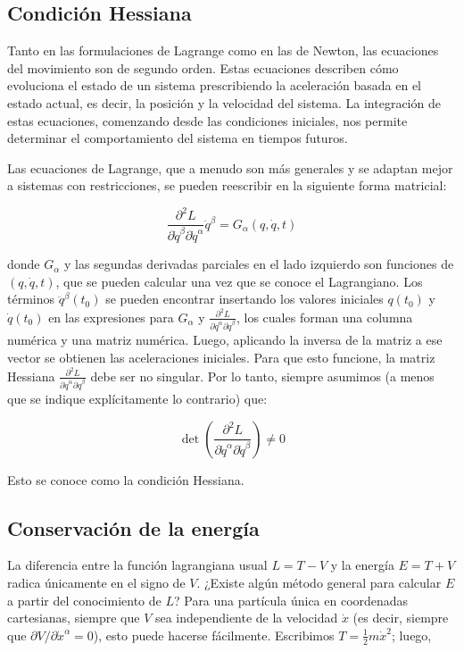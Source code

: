 \subsection{Condición Hessiana}

Tanto en las formulaciones de Lagrange como en las de Newton, las ecuaciones del movimiento son de segundo orden. Estas ecuaciones describen cómo evoluciona el estado de un sistema prescribiendo la aceleración basada en el estado actual, es decir, la posición y la velocidad del sistema. La integración de estas ecuaciones, comenzando desde las condiciones iniciales, nos permite determinar el comportamiento del sistema en tiempos futuros.

Las ecuaciones de Lagrange, que a menudo son más generales y se adaptan mejor a sistemas con restricciones, se pueden reescribir en la siguiente forma matricial:

\[
\frac{\partial^2 L}{\partial \dot{q}^\beta \partial \dot{q}^\alpha} \ddot{q}^\beta = G_\alpha (q, \dot{q}, t)
\]

donde $ G_\alpha $ y las segundas derivadas parciales en el lado izquierdo son funciones de $ (q, \dot{q}, t) $, que se pueden calcular una vez que se conoce el Lagrangiano. Los términos $ \ddot{q}^\beta \left(t_0\right) $ se pueden encontrar insertando los valores iniciales $ q \left(t_0\right) $ y $ \dot{q} \left(t_0\right) $ en las expresiones para $ G_\alpha $ y $ \frac{\partial^2 L}{\partial \dot{q}^\alpha \partial \dot{q}^\beta} $, los cuales forman una columna numérica y una matriz numérica. Luego, aplicando la inversa de la matriz a ese vector se obtienen las aceleraciones iniciales. Para que esto funcione, la matriz Hessiana $ \frac{\partial^2 L}{\partial \dot{q}^\alpha \partial \dot{q}^\beta} $ debe ser no singular. Por lo tanto, siempre asumimos (a menos que se indique explícitamente lo contrario) que:

\[
\operatorname{det}\left(\frac{\partial^2 L}{\partial \dot{q}^\alpha \partial \dot{q}^\beta}\right) \neq 0
\]

Esto se conoce como la condición Hessiana.

\subsection{Conservación de la energía}
La diferencia entre la función lagrangiana usual $L = T - V$ y la energía $E = T + V$ radica únicamente en el signo de $V$. ¿Existe algún método general para calcular $E$ a partir del conocimiento de $L$? Para una partícula única en coordenadas cartesianas, siempre que $V$ sea independiente de la velocidad $\dot{x}$ (es decir, siempre que $\partial V / \partial \dot{x}^{\alpha} = 0$), esto puede hacerse fácilmente. Escribimos $T = \frac{1}{2} m \dot{x}^{2}$; luego,


